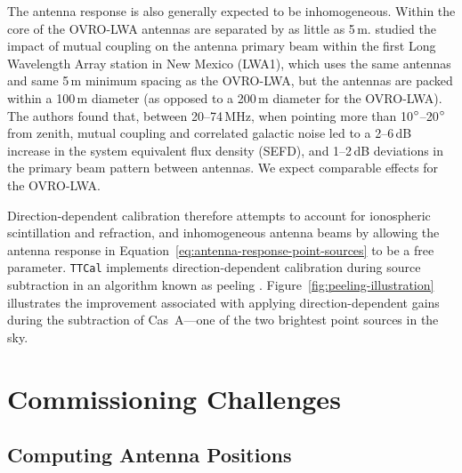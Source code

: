 \begin{bibunit}
The antenna response is also generally expected to be inhomogeneous.  Within the core of the
OVRO-LWA antennas are separated by as little as 5\,m.  \citet{2011ITAP...59.1855E} studied the
impact of mutual coupling on the antenna primary beam within the first Long Wavelength Array station
in New Mexico (LWA1), which uses the same antennas and same 5\,m minimum spacing as the OVRO-LWA,
but the antennas are packed within a 100\,m diameter (as opposed to a 200\,m diameter for the
OVRO-LWA). The authors found that, between 20--74\,MHz, when pointing more than
10$\mbox{$^\circ$}$--20$\mbox{$^\circ$}$ from zenith, mutual coupling and correlated galactic noise led to a
2--6\,dB increase in the system equivalent flux density (SEFD), and 1--2\,dB deviations in the
primary beam pattern between antennas. We expect comparable effects for the OVRO-LWA.

Direction-dependent calibration therefore attempts to account for ionospheric scintillation and
refraction, and inhomogeneous antenna beams by allowing the antenna response in
Equation~\ref{eq:antenna-response-point-sources} to be a free parameter.  \texttt{TTCal} implements
direction-dependent calibration during source subtraction in an algorithm known as peeling
\citep{2008ISTSP...2..707M}. Figure~\ref{fig:peeling-illustration} illustrates the improvement
associated with applying direction-dependent gains during the subtraction of Cas~A---one of the two
brightest point sources in the sky.

\section{Commissioning Challenges}
\label{sec:commissioning-challenges}

\subsection{Computing Antenna Positions}


\end{bibunit}
